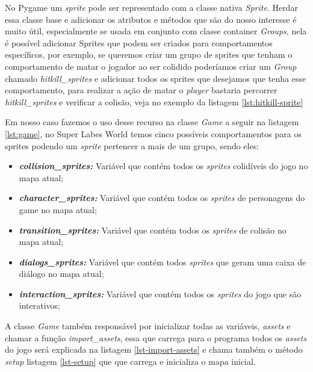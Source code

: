 \newpage
No Pygame um \textit{sprite} pode ser representado com a classe nativa \textit{Sprite}. Herdar essa classe base e adicionar os atributos e métodos que são do nosso interesse é muito útil, especialmente se usada em conjunto com classe container \textit{Groups}, nela é possível adicionar Sprites que podem ser criados para comportamentos específicos, por exemplo, se queremos criar um grupo de sprites que tenham o comportamento de matar o jogador ao ser colidido poderíamos criar um \textit{Group} chamado \textit{hitkill\_sprites} e adicionar todos os sprites que desejamos que tenha esse comportamento, para realizar a ação de matar o \textit{player} bastaria percorrer \textit{hitkill\_sprites} e verificar a colisão, veja no exemplo da listagem \ref{lst:hitkill-sprite}





Em nosso caso fazemos o uso desse recurso na classe \textit{Game} a seguir na listagem \ref{lst:game}, no Super Labes World temos cinco possíveis comportamentos para os sprites podendo um \textit{sprite} pertencer a mais de um grupo, sendo eles:
\begin{itemize}
    \item \textit{\textbf{collision\_sprites: }}Variável que contém todos os \textit{sprites} colidíveis do jogo no mapa atual;
    \item \textit{\textbf{character\_sprites: }}Variável que contém todos os \textit{sprites} de personagens do game no mapa atual;
    \item \textit{\textbf{transition\_sprites: }}Variável que contém todos os \textit{sprites} de colisão no mapa atual;
    \item \textit{\textbf{dialogs\_sprites: }}Variável que contém todos \textit{sprites} que geram uma caixa de diálogo no mapa atual;
    \item \textit{\textbf{interaction\_sprites: }}Variável que contém todos os \textit{sprites} do jogo que são interativos;
\end{itemize}

A classe \textit{Game} também responsável por inicializar todas as variáveis, \textit{assets} e chamar a função \textit{import\_assets}, essa que carrega para o programa todos os \textit{assets} do jogo será explicada na listagem \ref{lst-import-assets} e chama também o método \textit{setup} listagem \ref{lst-setup} que que carrega e inicializa o mapa inicial.


